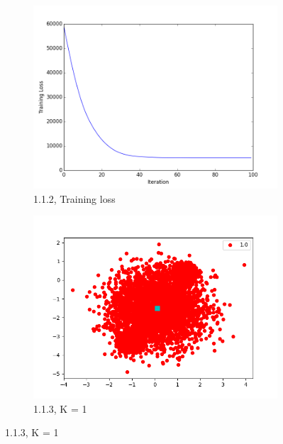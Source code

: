 \documentclass[12pt,letterpaper]{article}
\begin{document}
\begin{figure}
    \centering
    \begin{subfigure}[b]{0.45\textwidth}
        \includegraphics[width=\textwidth]{imgs/kmeans_train_loss.png}
        \caption{1.1.2, Training loss}
    \end{subfigure}
    \begin{subfigure}[b]{0.45\textwidth}
        \includegraphics[width=\textwidth]{imgs/kmeans_K_1.png}
        \caption{1.1.3, K = 1}
    \end{subfigure}


\end{figure}
\end{document}
